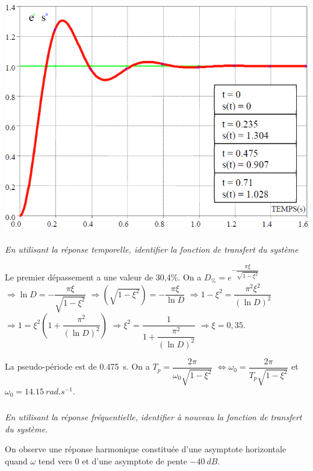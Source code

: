 \documentclass[10pt,fleqn]{article} %
\begin{document}
\begin{multicols}{2}
\begin{center}
\includegraphics[width=\linewidth]{images/fig_01}
\end{center}




\subparagraph{}\textit{En utilisant la réponse temporelle, identifier la fonction de transfert du système}
\ifprof
\begin{corrige}
Le premier dépassement a une valeur de 30,4\%. On a
$D_\%=e^{-\dfrac{\pi \xi}{\sqrt{1-\xi^2}}}$
$\Rightarrow \ln D = -\dfrac{\pi \xi}{\sqrt{1-\xi^2}}$
$\Rightarrow \left( \sqrt{1-\xi^2} \right)  = -\dfrac{\pi \xi}{\ln D}$
$\Rightarrow 1-\xi^2= \dfrac{\pi^2 \xi^2}{\left(\ln D\right)^2}$
$\Rightarrow 1= \xi^2\left( 1+\dfrac{\pi^2 }{\left(\ln D\right)^2}\right)$
$\Rightarrow \xi^2= \dfrac{1}{ 1+\dfrac{\pi^2 }{\left(\ln D\right)^2}}$
$\Rightarrow \xi=0,35$.

La pseudo-période est de \SI{0,475}{s}. On a  $T_p=\dfrac{2\pi}{\omega_0\sqrt{1-\xi^2}}$
$\Leftrightarrow \omega_0=\dfrac{2\pi}{T_p\sqrt{1-\xi^2}}$ et $\omega_0=\SI{14,15}{rad.s^{-1}}$.
 
\end{corrige}
\else
\fi

\subparagraph{}\textit{En utilisant la réponse fréquentielle, identifier à nouveau la fonction de transfert du système.}
\ifprof
\begin{corrige}
On observe une réponse harmonique constituée d'une asymptote horizontale quand $\omega$ tend vers 0 et d'une asymptote de pente $-\SI{40}{dB}$.

\end{corrige}
\else
\fi


\end{multicols}
\end{document}
